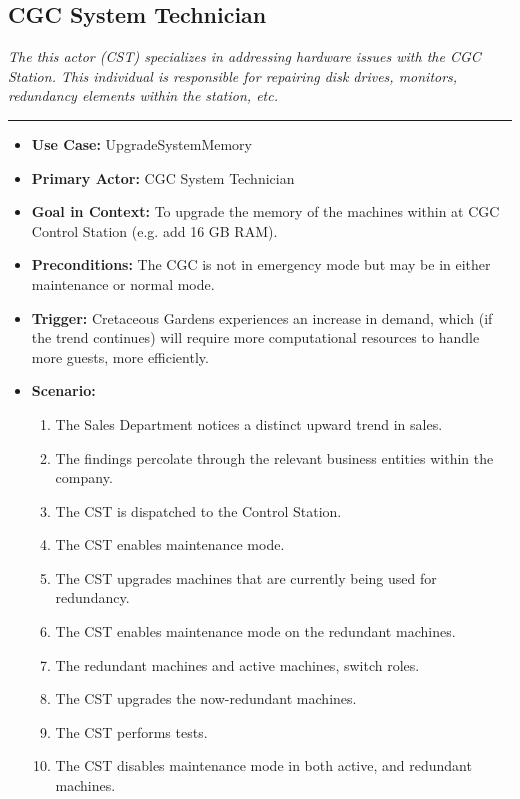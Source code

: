 \documentclass[12pt]{article}
\begin{document}
    \subsection{CGC System Technician}
    \textit{The this actor (CST) specializes in addressing hardware issues with the CGC Station. This
    individual is responsible for repairing disk drives, monitors, redundancy elements within the
    station, etc.}
    \par\noindent\rule{\textwidth}{0.4pt}    
    \begin{itemize}
        \item[]\textbf{Use Case:}                                
            UpgradeSystemMemory

        \item[]\textbf{Primary Actor:}
            CGC System Technician

        \item[]\textbf{Goal in Context:}
            To upgrade the memory of the machines within at CGC Control Station (e.g. add 16 GB RAM).

        \item[]\textbf{Preconditions:}
            The CGC is not in emergency mode but may be in either maintenance or normal mode.

        \item[]\textbf{Trigger:}
            Cretaceous Gardens experiences an increase in demand, which (if the trend continues) will
            require more computational resources to handle more guests, more efficiently.

        \item[]\textbf{Scenario:}
            \begin{enumerate}
                \item The Sales Department notices a distinct upward trend in sales.
                \item The findings percolate through the relevant business entities within the company.
                \item The CST is dispatched to the Control Station.
                \item The CST enables maintenance mode.
                \item The CST upgrades machines that are currently being used for redundancy.
                \item The CST enables maintenance mode on the redundant machines.
                \item The redundant machines and active machines, switch roles.
                \item The CST upgrades the now-redundant machines.
                \item The CST performs tests.
                \item The CST disables maintenance mode in both active, and redundant machines.
            \end{enumerate}


\end{itemize}
\end{document}
